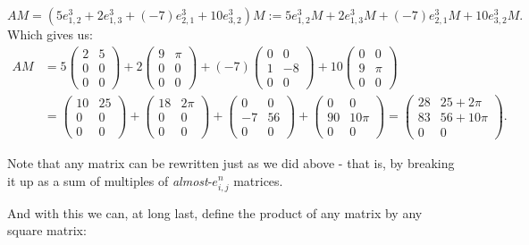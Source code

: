 \[AM=(5e^3_{1,2}+2e^3_{1,3}+(-7)e^3_{2,1}+10e^3_{3,2})M:=5e^3_{1,2}M+2e^3_{1,3}M+(-7)e^3_{2,1}M+10e^3_{3,2}M.\] Which gives us:
\begin{align*}
AM&=5\begin{pmatrix}
2 & 5\\
0 & 0\\
0 & 0
\end{pmatrix}+2\begin{pmatrix}
9 & \pi\\
0 & 0\\
0 & 0
\end{pmatrix}+(-7)\begin{pmatrix}
0 & 0\\
1 & -8\\
0 & 0
\end{pmatrix}+10\begin{pmatrix}
0 & 0\\
9 & \pi\\
0 & 0
\end{pmatrix}\\
&=\begin{pmatrix}
10 & 25\\
0 & 0\\
0 & 0
\end{pmatrix}+\begin{pmatrix}
18 & 2\pi\\
0 & 0\\
0 & 0
\end{pmatrix}+\begin{pmatrix}
0 & 0\\
-7 & 56\\
0 & 0
\end{pmatrix}+\begin{pmatrix}
0 & 0\\
90 & 10\pi\\
0 & 0
\end{pmatrix}=\begin{pmatrix}
28 & 25+2\pi\\
83 & 56+10\pi\\
0 & 0
\end{pmatrix}.
\end{align*}

\begin{rmk}
	Note that any matrix can be rewritten just as we did above - that is, by breaking it up as a sum of multiples of \textit{almost}-$e^n_{i,j}$ matrices.
\end{rmk}

And with this we can, at long last, define the product of any matrix by any square matrix:

